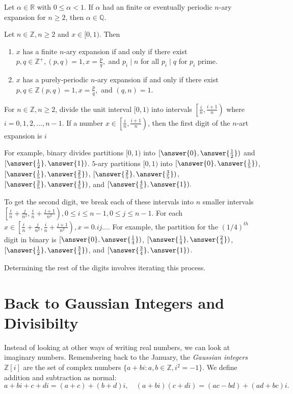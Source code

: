 \documentclass{ximera}
\begin{document}
\begin{theorem}
 Let $\alpha\in\mathbb{R}$ with $0\leq\alpha<1$. If $\alpha$ had an finite or eventually periodic $n$-ary expansion for $n\geq 2$, then $\alpha\in\mathbb{Q}$.
\end{theorem}

\begin{theorem}
 Let $n\in\mathbb{Z}, n\geq 2$ and $x\in[0,1)$. Then
 
\begin{enumerate}
 \item $x$ has a finite $n$-ary expansion if and only if there exist $p,q\in\mathbb{Z}^{+},(p,q)=1,x=\frac{p}{q},$ and $p_i\mid n$ for all $p_i\mid q$ for $p_i$ prime.
 \item $x$ has a purely-periodic $n$-ary expansion if and only if there exist $p,q\in\mathbb{Z}(p,q)=1,x=\frac{p}{q},$ and $(q,n)=1$.
\end{enumerate}
\end{theorem}


For $n\in\mathbb{Z},n\geq2$, divide the unit interval $[0,1)$ into intervals $\left[\frac{i}{n},\frac{i+1}{n}\right)$ where $i=0,1,2,\dots,n-1$. If a number $x\in\left[\frac{i}{n},\frac{i+1}{n}\right)$, then the first digit of the $n$-art expansion is $i$

For example, binary divides partitions $[0,1)$ into $[\answer{0},\answer{\frac{1}{2}})$ and $[\answer{\frac{1}{2}},\answer{1})$. $5$-ary partitions $[0,1)$ into $[\answer{0},\answer{\frac{1}{5}})$,$[\answer{\frac{1}{5}},\answer{\frac{2}{5}})$, $[\answer{\frac{2}{5}},\answer{\frac{3}{5}})$,$[\answer{\frac{3}{5}},\answer{\frac{4}{5}})$, and 
$[\answer{\frac{4}{5}},\answer{1}).$ 

To get the second digit, we break each of these intervals into $n$ smaller intervals $\left[\frac{i}{n}+\frac{j}{n^2},\frac{i}{n}+\frac{j+1}{n^2}\right), 0\leq i\leq n-1,0\leq j\leq n-1$. For each $x\in\left[\frac{i}{n}+\frac{j}{n^2},\frac{i}{n}+\frac{j+1}{n^2}\right), x=0.ij\dots.$ 
For example, the partition for the $(1/4)^{th}$ digit in binary is $[\answer{0},\answer{\frac{1}{4}})$, $[\answer{\frac{1}{4}},\answer{\frac{2}{4}})$, $[\answer{\frac{1}{2}},\answer{\frac{3}{4}})$, and $[\answer{\frac{3}{4}},\answer{1})$.

Determining the rest of the digits involves iterating this process.

\section*{Back to Gaussian Integers and Divisibilty}
Instead of looking at other ways of writing real numbers, we can look at imaginary numbers.
Remembering back to the January, the \emph{Gaussian integers $\mathbb{Z}[i]$} are the set of complex numbers $\{a+bi:a,b\in\mathbb{Z}, i^2=-1\}$. We define addition and subtraction as normal: \[a+bi+c+di=(a+c)+(b+d)i,\quad (a+bi)(c+di)=(ac-bd)+(ad+bc)i.\]
\end{document}
